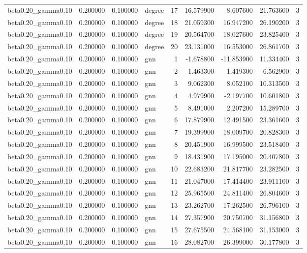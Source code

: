 \begin{tabular}{lrrlrrrrr}
beta0.20\_gamma0.10 & 0.200000 & 0.100000 & degree & 17 & 16.579900 & 8.607600 & 21.763600 & 3 \\
beta0.20\_gamma0.10 & 0.200000 & 0.100000 & degree & 18 & 21.059300 & 16.947200 & 26.190200 & 3 \\
beta0.20\_gamma0.10 & 0.200000 & 0.100000 & degree & 19 & 20.564700 & 18.027600 & 23.825400 & 3 \\
beta0.20\_gamma0.10 & 0.200000 & 0.100000 & degree & 20 & 23.131000 & 16.553000 & 26.861700 & 3 \\
beta0.20\_gamma0.10 & 0.200000 & 0.100000 & gnn & 1 & -1.678800 & -11.853900 & 11.334400 & 3 \\
beta0.20\_gamma0.10 & 0.200000 & 0.100000 & gnn & 2 & 1.463300 & -1.419300 & 6.562900 & 3 \\
beta0.20\_gamma0.10 & 0.200000 & 0.100000 & gnn & 3 & 9.062300 & 8.052100 & 10.313500 & 3 \\
beta0.20\_gamma0.10 & 0.200000 & 0.100000 & gnn & 4 & 4.979900 & -2.197700 & 10.601800 & 3 \\
beta0.20\_gamma0.10 & 0.200000 & 0.100000 & gnn & 5 & 8.491000 & 2.207200 & 15.289700 & 3 \\
beta0.20\_gamma0.10 & 0.200000 & 0.100000 & gnn & 6 & 17.879900 & 12.491500 & 23.361600 & 3 \\
beta0.20\_gamma0.10 & 0.200000 & 0.100000 & gnn & 7 & 19.399900 & 18.009700 & 20.828300 & 3 \\
beta0.20\_gamma0.10 & 0.200000 & 0.100000 & gnn & 8 & 20.451900 & 16.999500 & 23.518400 & 3 \\
beta0.20\_gamma0.10 & 0.200000 & 0.100000 & gnn & 9 & 18.431900 & 17.195000 & 20.407800 & 3 \\
beta0.20\_gamma0.10 & 0.200000 & 0.100000 & gnn & 10 & 22.683200 & 21.817700 & 23.282500 & 3 \\
beta0.20\_gamma0.10 & 0.200000 & 0.100000 & gnn & 11 & 21.047000 & 17.414400 & 23.911100 & 3 \\
beta0.20\_gamma0.10 & 0.200000 & 0.100000 & gnn & 12 & 25.965500 & 24.811400 & 26.804600 & 3 \\
beta0.20\_gamma0.10 & 0.200000 & 0.100000 & gnn & 13 & 23.262700 & 17.262500 & 26.796100 & 3 \\
beta0.20\_gamma0.10 & 0.200000 & 0.100000 & gnn & 14 & 27.357900 & 20.750700 & 31.156800 & 3 \\
beta0.20\_gamma0.10 & 0.200000 & 0.100000 & gnn & 15 & 27.675500 & 24.568100 & 31.153000 & 3 \\
beta0.20\_gamma0.10 & 0.200000 & 0.100000 & gnn & 16 & 28.082700 & 26.399000 & 30.177800 & 3 \\

\end{tabular}
